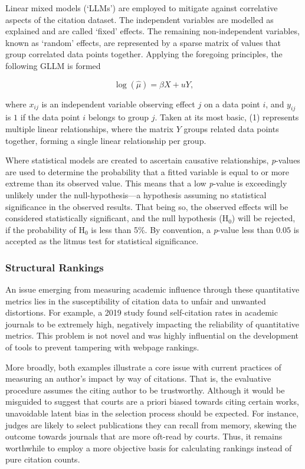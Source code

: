 Linear mixed models (`LLMs') are employed to mitigate against correlative aspects of the citation dataset. The independent variables are modelled as explained and are called `fixed' effects. The remaining non-independent variables, known as `random' effects, are represented by a sparse matrix of values that group correlated data points together. Applying the foregoing principles, the following GLLM is formed 

\begin{equation}
\log(\hat{\mu}) = \beta X + u Y,
\end{equation}

where $x_{ij}$ is an independent variable observing effect $j$ on a data point $i$, and $y_{ij}$ is $1$ if the data point $i$ belongs to group $j$. Taken at its most basic, (1) represents multiple linear relationships, where the matrix $Y$ groups related data points together, forming a single linear relationship per group.

Where statistical models are created to ascertain causative relationships, \textit{p}-values are used to determine the probability that a fitted variable is equal to or more extreme than its observed value. This means that a low \textit{p}-value is exceedingly unlikely under the null-hypothesis---a hypothesis assuming no statistical significance in the observed results. That being so, the observed effects will be considered statistically significant, and the null hypothesis ($\mathrm{H}_0$) will be rejected, if the probability of $\mathrm{H}_0$ is less than 5\%. By convention, a \textit{p}-value less than $0.05$ is accepted as the litmus test for statistical significance.

\subsubsection{Structural Rankings}
An issue emerging from measuring academic influence through these quantitative metrics lies in the susceptibility of citation data to unfair and unwanted distortions. For example, a 2019 study found self-citation rates in academic journals to be extremely high, negatively impacting the reliability of quantitative metrics. This problem is not novel and was highly influential on the development of tools to prevent tampering with webpage rankings. 

More broadly, both examples illustrate a core issue with current practices of measuring an author's impact by way of citations. That is, the evaluative procedure assumes the citing author to be trustworthy. Although it would be misguided to suggest that courts are a priori biased towards citing certain works, unavoidable latent bias in the selection process should be expected. For instance, judges are likely to select publications they can recall from memory, skewing the outcome towards journals that are more oft-read by courts. Thus, it remains worthwhile to employ a more objective basis for calculating rankings instead of pure citation counts.

